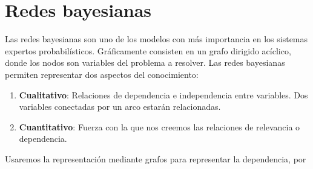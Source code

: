 \documentclass{article}
\begin{document}
\section{Redes bayesianas}

Las redes bayesianas son uno de los modelos con más importancia en los sistemas expertos probabilísticos. Gráficamente consisten en un grafo dirigido acíclico, donde los nodos son variables del problema a resolver. Las redes bayesianas permiten representar dos aspectos del conocimiento:

\begin{enumerate}
\item \textbf{Cualitativo}: Relaciones de dependencia e independencia entre variables. Dos variables conectadas por un arco estarán relacionadas.
\item \textbf{Cuantitativo}: Fuerza con la que nos creemos las relaciones de relevancia o dependencia.
\end{enumerate}

Usaremos la representación mediante grafos para representar la dependencia, por

\begin{center}
\end{center}
\end{document}
